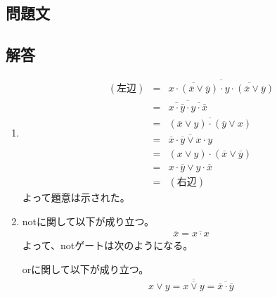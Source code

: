 \documentclass[dvipdfmx,titlepage, 11pt, a4paper]{jsarticle}%
\begin{document}
\section{}
\subsection{問題文}
\newpage
\subsection{解答}
\begin{enumerate}[(1)]
  \item 
  \begin{eqnarray*}
    (左辺)
    &=& 
    \overline{\overline{x\cdot (\overline{x}\vee\overline{y})}\cdot\overline{y\cdot (\overline{x}\vee \overline{y})}}\\
    &=& 
    \overline{\overline{x\cdot\overline{y}}\cdot\overline{y\cdot\overline{x}}}\\
    &=& 
    \overline{(\overline{x}\vee y)\cdot(\overline{y}\vee x)}\\
    &=& 
    \overline{\overline{x}\cdot\overline{y}\vee x\cdot y}\\
    &=& 
    (x\vee y)\cdot(\overline{x}\vee\overline{y})\\
    &=& 
    x\cdot\overline{y}\vee y\cdot \overline{x}\\
    &=&(右辺)
  \end{eqnarray*}
  よって題意は示された。
  \item notに関して以下が成り立つ。
  \begin{eqnarray*}
     \overline{x} = \overline{x\cdot x}
  \end{eqnarray*}
  よって、notゲートは次のようになる。
  \begin{figure}[H]
    \centering
  \end{figure}
  orに関して以下が成り立つ。
  \begin{eqnarray*}
     x\vee y = \overline{\overline{x\vee y}} = \overline{\overline{x}\cdot \overline{y}}
  \end{eqnarray*}

\end{enumerate}
\end{document}
